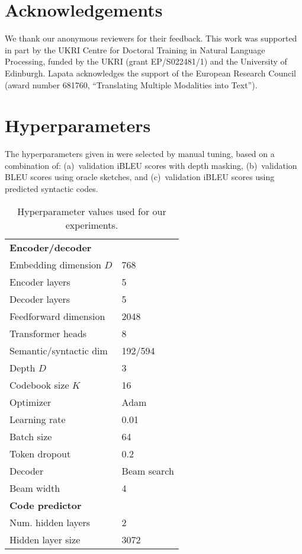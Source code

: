 \documentclass[11pt]{article}
\begin{document}
\section*{Acknowledgements}

We thank our anonymous reviewers for their feedback. This work was supported in part by the
UKRI Centre for Doctoral Training in Natural Language Processing,
funded by the UKRI (grant EP/S022481/1) and the University of
Edinburgh. Lapata acknowledges the support of the European Research
Council (award number 681760, ``Translating Multiple Modalities into
Text'').




\appendix



\section{Hyperparameters}
\label{app:hyperparams}

The hyperparameters given in  were selected by manual tuning, based on a combination
of: (a)~validation iBLEU scores with depth masking, (b)~validation BLEU scores
using oracle sketches, and (c)~validation iBLEU scores using
predicted syntactic codes.

\begin{table}[ht]
    \centering
\small
    \begin{tabular}{l|p{2cm}}
    \textbf{Encoder/decoder} & \\
    Embedding dimension $D$ & 768 \\
    Encoder layers & 5 \\
    Decoder layers & 5 \\
    Feedforward dimension & 2048 \\
    Transformer heads & 8 \\
    Semantic/syntactic dim & 192/594 \\
    Depth $D$& 3 \\
    Codebook size $K$& 16 \\
    Optimizer & Adam \cite{adam} \\
    Learning rate & 0.01 \\
    Batch size & 64 \\
    Token dropout & 0.2 \cite{tokendropout} \\
    Decoder & Beam search \\
    Beam width & 4 \\
    \hline
    \textbf{Code predictor} & \\
    Num. hidden layers & 2 \\
    Hidden layer size & 3072 \\
    
    \end{tabular}
    \caption{Hyperparameter values used for our experiments.}
    \label{tab:hyperparams}
\end{table}
\end{document}

